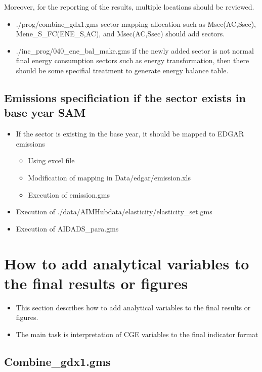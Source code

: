 \documentclass[10pt,a4paper,titlepage,dvipdfmx]{book}
\begin{document}
Moreover, for the reporting of the results, multiple locations should be reviewed.
\begin{itemize}
  \item ./prog/combine\_gdx1.gms
  sector mapping allocation such as Msec(AC,Ssec), Mene\_S\_FC(ENE\_S,AC), and Msec(AC,Ssec) should add sectors.
  \item ./inc\_prog/040\_ene\_bal\_make.gms
  if the newly added sector is not normal final energy consumption sectors such as energy transformation, then there should be some specifial treatment to generate energy balance table. 
\end{itemize}


\subsection{\label{subsec:EssPro}Emissions specificiation if the sector exists in base year SAM}

\begin{itemize}
\item If the sector is existing in the base year, it should be mapped to EDGAR emissions
\begin{itemize}
\item Using excel file
\item Modification of mapping in Data/edgar/emission.xls
\item Execution of emission.gms
\end{itemize}

\item Execution of ./data/AIMHubdata/elasticity/elasticity\_set.gms
\item Execution of AIDADS\_para.gms
\end{itemize}


\section{\label{sec:HowAddAnaVarFinRes}How to add analytical variables to the final results or figures}


\begin{itemize}
\item This section describes how to add analytical variables to the final results or figures.
\item The main task is interpretation of CGE variables to the final indicator format
\end{itemize}
\subsection{\label{subsec:Com1}Combine\_gdx1.gms}
\end{document}
